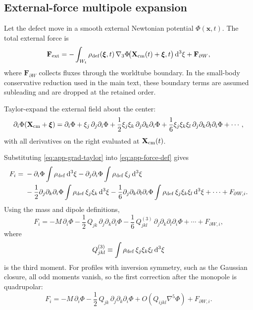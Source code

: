 \documentclass[11pt]{article}
\newcommand{\dd}{\mathrm d}
\newcommand{\x}{\mathbf x}
\newcommand{\gradThree}{\nabla_3}
\newcommand{\PhiN}{\Phi}
\begin{document}
\subsection{External-force multipole expansion}
\label{app:moments-force}

Let the defect move in a smooth external Newtonian potential \(\PhiN(\x,t)\). The total
external force is
\begin{equation}
\mathbf F_{\rm ext}
=
-\int_{W_t}\rho_{\rm def}(\boldsymbol{\xi},t)\,
\gradThree \PhiN\!\bigl(\mathbf X_{\rm cm}(t)+\boldsymbol{\xi},t\bigr)\,\dd^3\xi
+
\mathbf F_{\partial W},
\label{eq:app-force-def}
\end{equation}
where \(\mathbf F_{\partial W}\) collects fluxes through the worldtube boundary. In the
small-body conservative reduction used in the main text, these boundary terms are assumed
subleading and are dropped at the retained order.

Taylor-expand the external field about the center:
\begin{equation}
\partial_i \PhiN(\mathbf X_{\rm cm}+\boldsymbol{\xi})
=
\partial_i\PhiN
+
\xi_j\,\partial_j\partial_i\PhiN
+
\frac12\xi_j\xi_k\,\partial_j\partial_k\partial_i\PhiN
+
\frac{1}{6}\xi_j\xi_k\xi_l\,\partial_j\partial_k\partial_l\partial_i\PhiN
+\cdots,
\label{eq:app-grad-taylor}
\end{equation}
with all derivatives on the right evaluated at \(\mathbf X_{\rm cm}(t)\).

Substituting \eqref{eq:app-grad-taylor} into \eqref{eq:app-force-def} gives
\begin{align}
F_i
={}&
-\partial_i\PhiN \int \rho_{\rm def}\,\dd^3\xi
-\partial_j\partial_i\PhiN \int \rho_{\rm def}\,\xi_j\,\dd^3\xi
\nonumber\\
&
-\frac12\partial_j\partial_k\partial_i\PhiN
\int \rho_{\rm def}\,\xi_j\xi_k\,\dd^3\xi
-\frac{1}{6}\partial_j\partial_k\partial_l\partial_i\PhiN
\int \rho_{\rm def}\,\xi_j\xi_k\xi_l\,\dd^3\xi
+\cdots
+
F_{\partial W,i}.
\label{eq:app-force-expanded-raw}
\end{align}
Using the mass and dipole definitions,
\begin{equation}
F_i
=
- M\,\partial_i\PhiN
-\frac12\,Q_{jk}\,\partial_j\partial_k\partial_i\PhiN
-\frac{1}{6}\,Q_{jkl}^{(3)}\,\partial_j\partial_k\partial_l\partial_i\PhiN
+\cdots
+
F_{\partial W,i},
\label{eq:app-force-multipole}
\end{equation}
where
\begin{equation}
Q_{jkl}^{(3)}
\equiv
\int \rho_{\rm def}\,\xi_j\xi_k\xi_l\,\dd^3\xi
\label{eq:app-third-moment}
\end{equation}
is the third moment. For profiles with inversion symmetry, such as the Gaussian closure,
all odd moments vanish, so the first correction after the monopole is quadrupolar:
\begin{equation}
F_i
=
- M\,\partial_i\PhiN
-\frac12\,Q_{jk}\,\partial_j\partial_k\partial_i\PhiN
+O(Q_{ijkl}\nabla^5\PhiN)
+
F_{\partial W,i}.
\label{eq:app-force-quadrupole}
\end{equation}
\end{document}
